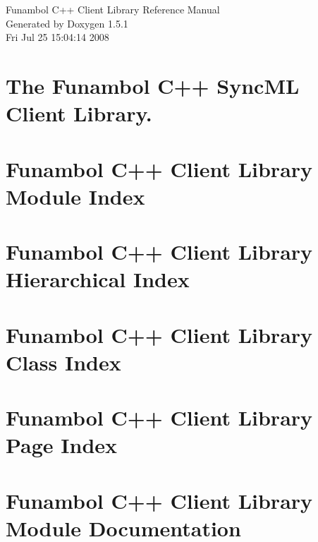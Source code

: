 \documentclass[a4paper]{book}
\begin{document}
\begin{titlepage}
\vspace*{7cm}
\begin{center}
{\Large Funambol C++ Client Library Reference Manual}\\
\vspace*{1cm}
{\large Generated by Doxygen 1.5.1}\\
\vspace*{0.5cm}
{\small Fri Jul 25 15:04:14 2008}\\
\end{center}
\end{titlepage}
\clearemptydoublepage
{}
\tableofcontents
\clearemptydoublepage
{}
\chapter{The Funambol C++ Sync\-ML Client Library. }
\label{index}
\chapter{Funambol C++ Client Library Module Index}

\chapter{Funambol C++ Client Library Hierarchical Index}

\chapter{Funambol C++ Client Library Class Index}

\chapter{Funambol C++ Client Library Page Index}

\chapter{Funambol C++ Client Library Module Documentation}




\end{document}

